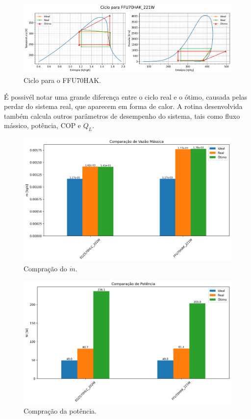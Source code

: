 \begin{figure}[ht]
    \centering
    \includegraphics[width=0.9\linewidth]{Imagens/Desenvolvimento/ciclo_FFU70HAK_221W.png}
    \caption{Ciclo para o FFU70HAK.}
    \label{fig:ciclo comp 2}
\end{figure}

É possivél notar uma grande diferença entre o ciclo real e o ótimo, causada pelas perdar do sistema real, que aparecem em forma de calor. A rotina desenvolvida também calcula outros parâmetros de desempenho do sistema, tais como fluxo mássico, potência, COP e ${Q_L}$.

\newpage

\begin{figure}[ht]
    \centering
    \includegraphics[width=0.8\linewidth]{Imagens/Desenvolvimento/barras_m.png}
    \caption{Compração do $\dot{m}$.}
    \label{fig:barras fluxo massa}
\end{figure}

\begin{figure}[ht]
    \centering
    \includegraphics[width=0.8\linewidth]{Imagens/Desenvolvimento/barras_W.png}
    \caption{Compração da potência.}
    \label{fig:barras W}
\end{figure}

